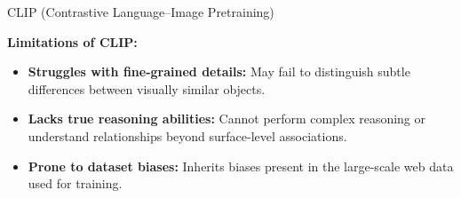 \begin{frame}[allowframebreaks]{CLIP (Contrastive Language–Image Pretraining)}
\begin{itemize}
        \end{itemize}
\framebreak
    \textbf{Limitations of CLIP:}
        \begin{itemize}
            \item \textbf{Struggles with fine-grained details:} May fail to distinguish subtle differences between visually similar objects.
            \item \textbf{Lacks true reasoning abilities:} Cannot perform complex reasoning or understand relationships beyond surface-level associations.
            \item \textbf{Prone to dataset biases:} Inherits biases present in the large-scale web data used for training.
        \end{itemize}
\end{frame}